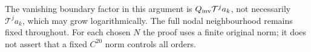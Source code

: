 The vanishing boundary factor in this argument is
$Q_{\rm inv}\mathcal T^ja_k$, not necessarily $\mathcal T^ja_k$,
which may grow logarithmically.  The full nodal neighbourhood remains
fixed throughout.  For each chosen $N$ the proof uses a finite original
norm; it does not assert that a fixed $C^{20}$ norm controls all orders.
